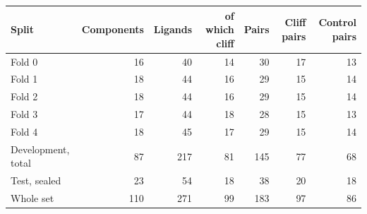 \begin{tabular}{lrrrrrr}
\toprule
Split & Components & Ligands & of which cliff & Pairs & Cliff pairs & Control pairs \\
\midrule
Fold 0 & 16 & 40 & 14 & 30 & 17 & 13 \\
Fold 1 & 18 & 44 & 16 & 29 & 15 & 14 \\
Fold 2 & 18 & 44 & 16 & 29 & 15 & 14 \\
Fold 3 & 17 & 44 & 18 & 28 & 15 & 13 \\
Fold 4 & 18 & 45 & 17 & 29 & 15 & 14 \\
\midrule
Development, total & 87 & 217 & 81 & 145 & 77 & 68 \\
Test, sealed & 23 & 54 & 18 & 38 & 20 & 18 \\
\midrule
Whole set & 110 & 271 & 99 & 183 & 97 & 86 \\
\bottomrule
\end{tabular}
